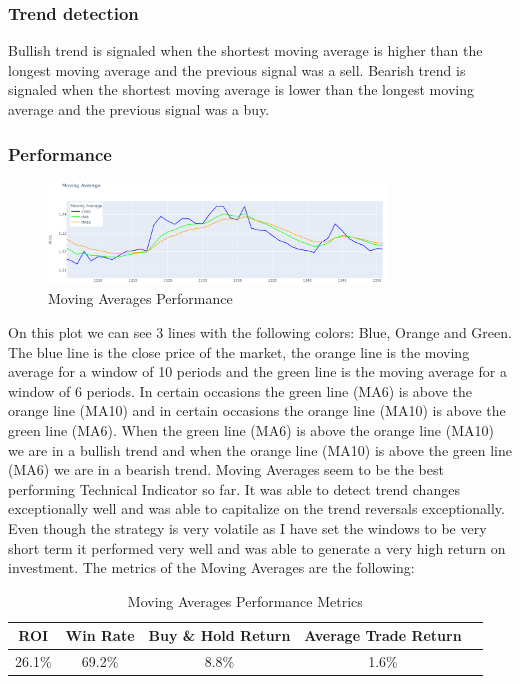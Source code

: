 \documentclass{imc-inf}
\begin{document}
	\subsubsection{Trend detection}
	Bullish trend is signaled when the shortest moving average is higher than the longest moving average and the previous signal was a sell.
	Bearish trend is signaled when the shortest moving average is lower than the longest moving average and the previous signal was a buy.
	
	\subsubsection{Performance}
	\begin{figure}[h!]
		\centering
		\includegraphics[width=0.8\textwidth]{moving_averages_plot.png}
		\caption{Moving Averages Performance}
		\label{fig:moving_averages_performance}
	\end{figure}
	On this plot we can see 3 lines with the following colors: Blue, Orange and Green. The blue line is the close price of the market, the orange line is the moving average for 
	a window of 10 periods and the green line is the moving average for a window of 6 periods. 
	In certain occasions the green line (MA6) is above the orange line (MA10) and in certain occasions the orange line (MA10) is above the green line (MA6).
	When the green line (MA6) is above the orange line (MA10) we are in a bullish trend and when the orange line (MA10) is above the green line (MA6) we are in a bearish trend.
	Moving Averages seem to be the best performing Technical Indicator so far. It was able to detect trend changes exceptionally well and was able 
	to capitalize on the trend reversals exceptionally. Even though the strategy is very volatile as I have set the windows to be very short term it performed 
	very well and was able to generate a very high return on investment.
	The metrics of the Moving Averages are the following:
	\begin{table}[h!]
		\centering
		\begin{tabular}{|c|c|c|c|c|}
			\hline
			\textbf{ROI} & \textbf{Win Rate} & \textbf{Buy \& Hold Return} & \textbf{Average Trade Return} \\ \hline
			26.1\%         & 69.2\%               & 8.8\%                         & 1.6\%                           \\ \hline
		\end{tabular}
		\caption{Moving Averages Performance Metrics}
		\label{tab:moving_averages_performance_metrics}
		
	\end{table}
\end{document}
